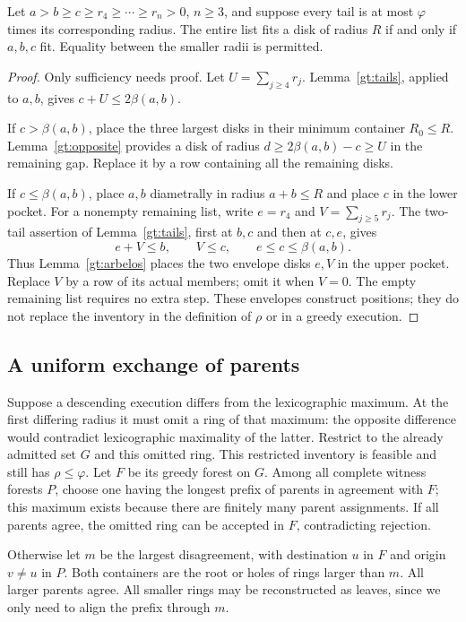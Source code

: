 \begin{theorem}\label{gt:three}
Let $a>b\ge c\ge r_4\ge\cdots\ge r_n>0$, $n\ge3$, and
suppose every tail is at most $\varphi$ times its corresponding radius.
The entire list fits a disk of radius $R$ if and only if $a,b,c$ fit.
Equality between the smaller radii is permitted.
\end{theorem}
\begin{proof}
Only sufficiency needs proof. Let $U=\sum_{j\ge4}r_j$.
Lemma~\ref{gt:tails}, applied to $a,b$, gives
$c+U\le2\beta(a,b)$.

If $c>\beta(a,b)$, place the three largest disks in their minimum
container $R_0\le R$. Lemma~\ref{gt:opposite} provides a disk
of radius $d\ge2\beta(a,b)-c\ge U$ in the remaining gap. Replace
it by a row containing all the remaining disks.

If $c\le\beta(a,b)$, place $a,b$ diametrally in radius $a+b\le R$
and place $c$ in the lower pocket. For a nonempty remaining list,
write $e=r_4$ and $V=\sum_{j\ge5}r_j$. The two-tail assertion
of Lemma~\ref{gt:tails}, first at $b,c$ and then at $c,e$, gives
\[
 e+V\le b,\qquad V\le c,\qquad e\le c\le\beta(a,b).
\]
Thus Lemma~\ref{gt:arbelos} places the two envelope disks $e,V$
in the upper pocket. Replace $V$ by a row of its actual members;
omit it when $V=0$. The empty remaining list requires no extra step.
These envelopes construct positions; they do not replace the inventory
in the definition of $\rho$ or in a greedy execution.
\end{proof}

\subsection{A uniform exchange of parents}

Suppose a descending execution differs from the lexicographic maximum.
At the first differing radius it must omit a ring of that maximum:
the opposite difference would contradict lexicographic maximality of
the latter. Restrict to the already admitted set $G$ and this omitted ring.
This restricted inventory is feasible and still has $\rho\le\varphi$.
Let $F$ be its greedy forest on $G$. Among all complete witness forests
$P$, choose one having the longest prefix of parents in agreement
with $F$; this maximum exists because there are finitely many parent
assignments. If all parents agree, the omitted ring can be accepted
in $F$, contradicting rejection.

Otherwise let $m$ be the largest disagreement, with destination $u$
in $F$ and origin $v\ne u$ in $P$. Both containers are the root or
holes of rings larger than $m$. All larger parents agree. All smaller
rings may be reconstructed as leaves, since we only need to align
the prefix through $m$.

